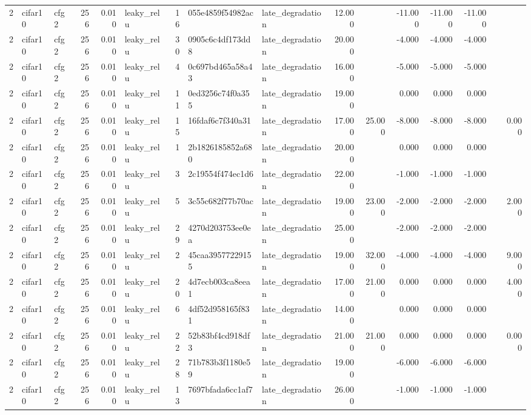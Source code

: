 \begin{table}[htbp]
{\begin{tabular}{@{}rllrrlrllrrrrrrr@{}}
2 & cifar10 & cfg2 & 256 & 0.010 & leaky\_relu & 16 & 055e4859f54982ac & late\_degradation & 12.000 &  & -11.000 & -11.000 & -11.000 &  &  \\
2 & cifar10 & cfg2 & 256 & 0.010 & leaky\_relu & 30 & 0905c6c4df173dd8 & late\_degradation & 20.000 &  & -4.000 & -4.000 & -4.000 &  &  \\
2 & cifar10 & cfg2 & 256 & 0.010 & leaky\_relu & 4 & 0c697bd465a58a43 & late\_degradation & 16.000 &  & -5.000 & -5.000 & -5.000 &  &  \\
2 & cifar10 & cfg2 & 256 & 0.010 & leaky\_relu & 11 & 0ed3256c74f0a355 & late\_degradation & 19.000 &  & 0.000 & 0.000 & 0.000 &  &  \\
2 & cifar10 & cfg2 & 256 & 0.010 & leaky\_relu & 15 & 16fdaf6c7f340a31 & late\_degradation & 17.000 & 25.000 & -8.000 & -8.000 & -8.000 &  & 0.000 \\
2 & cifar10 & cfg2 & 256 & 0.010 & leaky\_relu & 1 & 2b1826185852a680 & late\_degradation & 20.000 &  & 0.000 & 0.000 & 0.000 &  &  \\
2 & cifar10 & cfg2 & 256 & 0.010 & leaky\_relu & 3 & 2c19554f474ec1d6 & late\_degradation & 22.000 &  & -1.000 & -1.000 & -1.000 &  &  \\
2 & cifar10 & cfg2 & 256 & 0.010 & leaky\_relu & 5 & 3c55c682f77b70ac & late\_degradation & 19.000 & 23.000 & -2.000 & -2.000 & -2.000 &  & 2.000 \\
2 & cifar10 & cfg2 & 256 & 0.010 & leaky\_relu & 29 & 4270d203753ee0ea & late\_degradation & 25.000 &  & -2.000 & -2.000 & -2.000 &  &  \\
2 & cifar10 & cfg2 & 256 & 0.010 & leaky\_relu & 2 & 45caa39577229155 & late\_degradation & 19.000 & 32.000 & -4.000 & -4.000 & -4.000 &  & 9.000 \\
2 & cifar10 & cfg2 & 256 & 0.010 & leaky\_relu & 20 & 4d7ecb003ca8eea1 & late\_degradation & 17.000 & 21.000 & 0.000 & 0.000 & 0.000 &  & 4.000 \\
2 & cifar10 & cfg2 & 256 & 0.010 & leaky\_relu & 6 & 4df52d958165f831 & late\_degradation & 14.000 &  & 0.000 & 0.000 & 0.000 &  &  \\
2 & cifar10 & cfg2 & 256 & 0.010 & leaky\_relu & 22 & 52b83bf4cd918df3 & late\_degradation & 21.000 & 21.000 & 0.000 & 0.000 & 0.000 &  & 0.000 \\
2 & cifar10 & cfg2 & 256 & 0.010 & leaky\_relu & 28 & 71b783b3f1180e59 & late\_degradation & 19.000 &  & -6.000 & -6.000 & -6.000 &  &  \\
2 & cifar10 & cfg2 & 256 & 0.010 & leaky\_relu & 13 & 7697bfada6cc1af7 & late\_degradation & 26.000 &  & -1.000 & -1.000 & -1.000 &  &  \\

\end{tabular}}
\end{table}
